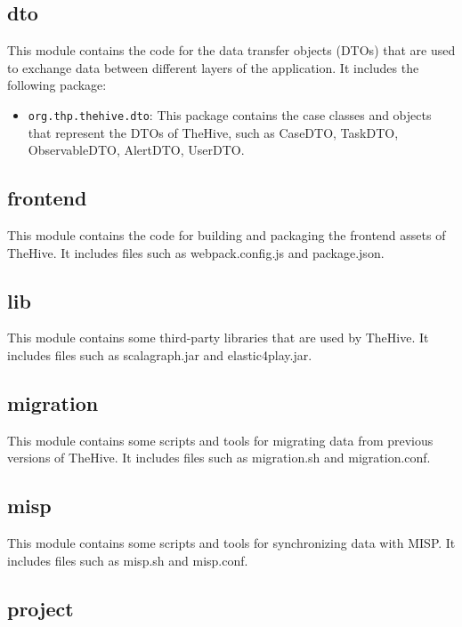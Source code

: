\subsection{dto}

This module contains the code for the data transfer objects (DTOs) that are used to exchange data between different layers of the application. It includes the following package:

\begin{itemize}
    \item \texttt{org.thp.thehive.dto}: This package contains the case classes and objects that represent the DTOs of TheHive, such as CaseDTO, TaskDTO, ObservableDTO, AlertDTO, UserDTO.
\end{itemize}

\subsection{frontend}

This module contains the code for building and packaging the frontend assets of TheHive. It includes files such as webpack.config.js and package.json.

\subsection{lib}

This module contains some third-party libraries that are used by TheHive. It includes files such as scalagraph.jar and elastic4play.jar.

\subsection{migration}

This module contains some scripts and tools for migrating data from previous versions of TheHive. It includes files such as migration.sh and migration.conf.

\subsection{misp}

This module contains some scripts and tools for synchronizing data with MISP. It includes files such as misp.sh and misp.conf.

\subsection{project}

